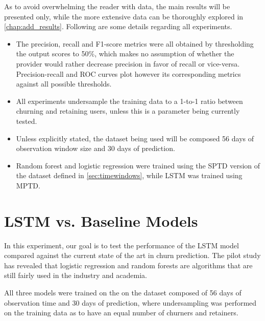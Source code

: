 \documentclass{kththesis}
\begin{document}
 As to avoid overwhelming the reader with data, the main results will be presented only, while the more extensive data can be thoroughly explored in \autoref{chap:add_results}. Following are some details regarding all experiments.

\begin{itemize}
\item The precision, recall and F1-score metrics were all obtained by thresholding the output scores to 50\%, which makes no assumption of whether the provider would rather decrease precision in favor of recall or vice-versa. Precision-recall and ROC curves plot however its corresponding metrics against all possible thresholds.
\item All experiments undersample the training data to a 1-to-1 ratio between churning and retaining users, unless this is a parameter being currently tested.
\item Unless explicitly stated, the dataset being used will be composed 56 days of observation window size and 30 days of prediction.
\item Random forest and logistic regression were trained using the SPTD version of the dataset defined in \autoref{sec:timewindows},  while LSTM was trained using MPTD.
\end{itemize}

\section{LSTM vs. Baseline Models}

In this experiment, our goal is to test the performance of the LSTM model compared against the current state of the art in churn prediction. The pilot study has revealed that logistic regression and random forests are algorithms that are still fairly used in the industry and academia.

All three models were trained on the on the dataset composed of 56 days of observation time and 30 days of prediction, where undersampling was performed on the training data as to have an equal number of churners and retainers.
\end{document}
